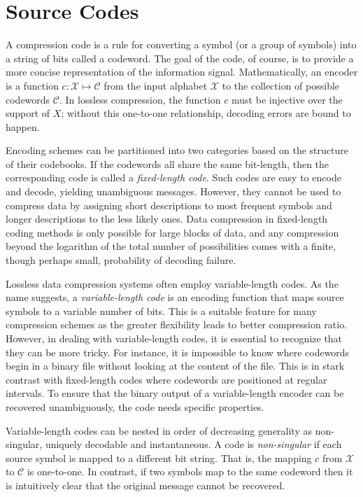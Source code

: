 \section{Source Codes}

A compression code is a rule for converting a symbol (or a group of symbols) into a string of bits called a codeword.
The goal of the code, of course, is to provide a more concise representation of the information signal.
Mathematically, an encoder is a function $c : \mathcal{X} \mapsto \mathcal{C}$ from the input alphabet $\mathcal{X}$ to the collection of possible codewords $\mathcal{C}$.
In lossless compression, the function $c$ must be injective over the support of $X$; without this one-to-one relationship, decoding errors are bound to happen.

Encoding schemes can be partitioned into two categories based on the structure of their codebooks.
If the codewords all share the same bit-length, then the corresponding code is called a \emph{fixed-length code}.
Such codes are easy to encode and decode, yielding unambiguous messages.
However, they cannot be used to compress data by assigning short descriptions to most frequent symbols and longer descriptions to the less likely ones.
Data compression in fixed-length coding methods is only possible for large blocks of data, and any compression beyond the logarithm of the total number of possibilities comes with a finite, though perhaps small, probability of decoding failure.

Lossless data compression systems often employ variable-length codes.
As the name suggests, a \emph{variable-length code} is an encoding function that maps source symbols to a variable number of bits.
This is a suitable feature for many compression schemes as the greater flexibility leads to better compression ratio.
However, in dealing with variable-length codes, it is essential to recognize that they can be more tricky.
For instance, it is impossible to know where codewords begin in a binary file without looking at the content of the file.
This is in stark contrast with fixed-length codes where codewords are positioned at regular intervals.
To ensure that the binary output of a variable-length encoder can be recovered unambiguously, the code needs specific properties.

Variable-length codes can be nested in order of decreasing generality as non-singular, uniquely decodable and instantaneous.
A code is \emph{non-singular} if each source symbol is mapped to a different bit string.
That is, the mapping $c$ from $\mathcal{X}$ to $\mathcal{C}$ is one-to-one.
In contrast, if two symbols map to the same codeword then it is intuitively clear that the original message cannot be recovered.

